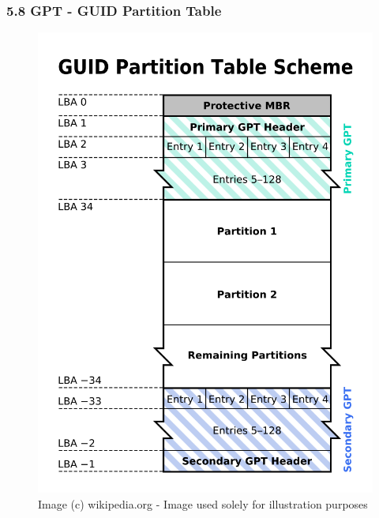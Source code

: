 \begin{frame}[fragile]
  \frametitle{5.8 GPT - GUID Partition Table}
    \begin{figure}
        \caption[]{\tiny Image (c) wikipedia.org - Image used solely for illustration purposes}
	    \includegraphics[scale=0.23,angle=270]{images/gpt.png}
        \captionsetup{labelformat=empty,labelsep=none}
    \end{figure}
\end{frame}


